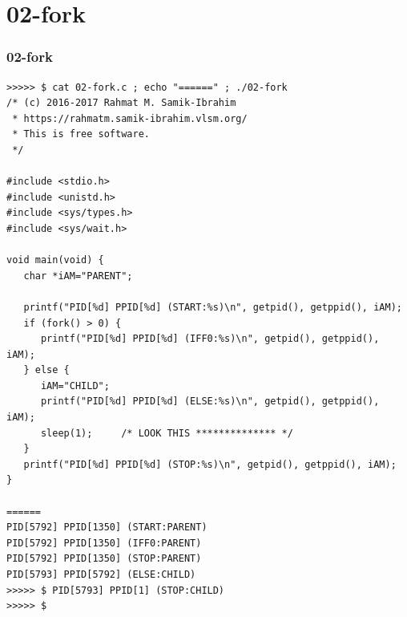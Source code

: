 \documentclass[xcolor=table, notheorems, hyperref={pdfpagelabels=false}]{beamer}
\begin{document}
\section{02-fork}
\begin{frame}[fragile]
\frametitle{02-fork}
\begin{lstlisting}[basicstyle=\ttfamily\tiny]
>>>>> $ cat 02-fork.c ; echo "======" ; ./02-fork 
/* (c) 2016-2017 Rahmat M. Samik-Ibrahim
 * https://rahmatm.samik-ibrahim.vlsm.org/
 * This is free software.
 */

#include <stdio.h>
#include <unistd.h>
#include <sys/types.h>
#include <sys/wait.h>

void main(void) {
   char *iAM="PARENT";
  
   printf("PID[%d] PPID[%d] (START:%s)\n", getpid(), getppid(), iAM);
   if (fork() > 0) {
      printf("PID[%d] PPID[%d] (IFF0:%s)\n", getpid(), getppid(), iAM);
   } else {
      iAM="CHILD";
      printf("PID[%d] PPID[%d] (ELSE:%s)\n", getpid(), getppid(), iAM);
      sleep(1);     /* LOOK THIS ************** */
   }
   printf("PID[%d] PPID[%d] (STOP:%s)\n", getpid(), getppid(), iAM);
}

======
PID[5792] PPID[1350] (START:PARENT)
PID[5792] PPID[1350] (IFF0:PARENT)
PID[5792] PPID[1350] (STOP:PARENT)
PID[5793] PPID[5792] (ELSE:CHILD)
>>>>> $ PID[5793] PPID[1] (STOP:CHILD)
>>>>> $
\end{lstlisting}
\end{frame}

\end{document}
